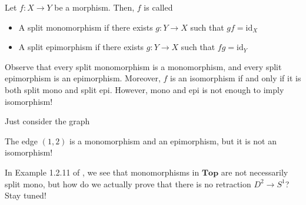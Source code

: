 \documentclass[12pt,reqno]{amsart}
\numberwithin{theorem}{section}
\theoremstyle{definition}
\theoremstyle{remark}
\numberwithin{equation}{section}
\theoremstyle{definition}
\newcommand{\id}{\mathrm{id}}
\begin{document}
\begin{definition}
    Let $f:X\rightarrow Y$ be a morphism. Then, $f$ is called
    \begin{itemize}
        \item A split monomorphism if there exists $g:Y\rightarrow X$ such that $gf = \id_X$
        \item A split epimorphism if there exists $g:Y\rightarrow X$ such that $fg = \id_Y$
    \end{itemize}
\end{definition}
Observe that every split monomorphism is a monomorphism, and every split epimorphism is an epimorphism. Moreover, $f$ is an isomorphism if and only if it is both split mono and split epi. However, mono and epi is not enough to imply isomorphism!
\begin{example}
    Just consider the graph
    \begin{center}
    \end{center}
    The edge $(1,2)$ is a monomorphism and an epimorphism, but it is not an isomorphism!
\end{example}
In Example 1.2.11 of \cite{perrone}, we see that monomorphisms in $\mathbf{Top}$ are not necessarily split mono, but how do we actually prove that there is no retraction $D^2 \rightarrow S^1$? Stay tuned!
\end{document}
